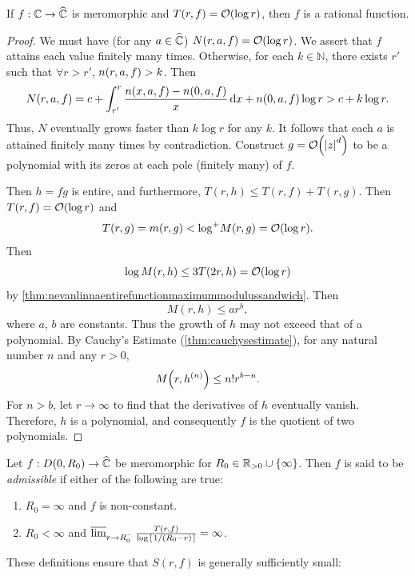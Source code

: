 \begin{proposition}\label{prop:nevanlinnaorderrationalcondition}
    If \(f:\mathbb{C}\to\widehat{\mathbb{C}}\) is meromorphic and \(T(r,f)=\order{\log r}\), then \(f\) is a rational function.
\end{proposition}
\begin{proof}
    We must have (for any \(a\in\widehat{\mathbb{C}}\)) \(N(r,a,f)=\order{\log r}\). We assert that \(f\) attains each value finitely many times. Otherwise, for each \(k\in\mathbb{N}\), there exists \(r'\) such that \(\forall r>r'\), \(n\qty(r,a,f)>k\). Then \[N(r,a,f)=c+\int_{r'}^{r}\frac{n(x,a,f)-n(0,a,f)}{x}\dd{x}+n(0,a,f)\log r>c+k\log r.\]
    Thus, \(N\) eventually grows faster than \(k\log r\) for any \(k\). It follows that each \(a\) is attained finitely many times by contradiction. Construct \(g=\order{\abs{z}^d}\) to be a polynomial with its zeros at each pole (finitely many) of \(f\).

    Then \(h=fg\) is entire, and furthermore, \(T(r,h)\leq T(r,f)+T(r,g)\). Then \(T(r,f)=\order{\log r}\) and \[T(r,g)=m(r,g)<\logp M(r,g)=\order{\log r}.\]
    Then \[\log M(r,h)\leq 3T(2r,h)=\order{\log r}\] by \cref{thm:nevanlinnaentirefunctionmaximummodulussandwich}. Then \[M(r,h)\leq ar^b,\] where \(a\), \(b\) are constants. Thus the growth of \(h\) may not exceed that of a polynomial. By Cauchy's Estimate (\cref{thm:cauchysestimate}), for any natural number \(n\) and any \(r>0\), \[M\qty(r,h^{(n)})\leq n!r^{b-n}.\]
    For \(n>b\), let \(r\to\infty\) to find that the derivatives of \(h\) eventually vanish. Therefore, \(h\) is a polynomial, and consequently \(f\) is the quotient of two polynomials.
\end{proof}
\begin{definition}
    Let \(f:D\qty(0,R_0)\to\widehat{\mathbb{C}}\) be meromorphic for \(R_0\in\mathbb{R}_{>0}\cup\qty{\infty}\). Then \(f\) is said to be \textit{admissible} if either of the following are true:
    \begin{enumerate}
        \item \(R_0=\infty\) and \(f\) is non-constant.
        \item \(R_0<\infty\) and \(\varlimsup_{r\to R_0^-}\tfrac{T(r,f)}{\log\qty[\flatfrac{1}{\qty(R_0-r)}]}=\infty\).
    \end{enumerate}
\end{definition}
These definitions ensure that \(S(r,f)\) is generally sufficiently small:
